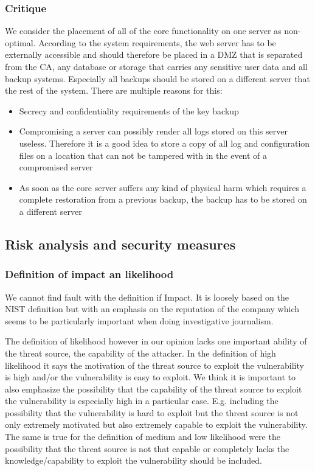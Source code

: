 \documentclass{article}
\begin{document}
\subsubsection{Critique}
We consider the placement of all of the core functionality on one server as non-optimal. According to the system requirements, the web server has to be externally accessible and should therefore be placed in a DMZ that is separated from the CA, any database or storage that carries any sensitive user data and all backup systems.\newline
Especially all backups should be stored on a different server that the rest of the system. There are multiple reasons for this:
	\begin{itemize}
	\item Secrecy and confidentiality requirements of the key backup
	\item Compromising a server can possibly render all logs stored on this server useless. Therefore it is a good idea to store a copy of all log and configuration files on a location that can not be tampered with in the event of a compromised server
	\item As soon as the core server suffers any kind of physical harm which requires a complete restoration from a previous backup, the backup has to be stored on a different server
	\end{itemize}

\subsection{Risk analysis and security measures}
\subsubsection{Definition of impact an likelihood}
We cannot find fault with the definition if Impact. It is loosely based on the NIST definition but with an emphasis on the reputation of the company which seems to be particularly important when doing investigative journalism.

The definition of likelihood however in our opinion lacks one important ability of the threat source, the capability of the attacker. In the definition of high likelihood it says the motivation of the threat source to exploit the vulnerability is high and/or the vulnerability is easy to exploit. We think it is important to also emphasize the possibility that the capability of the threat source to exploit the vulnerability is especially high in a particular case. E.g. including the possibility that the vulnerability is hard to exploit but the threat source is not only extremely motivated but also extremely capable to exploit the vulnerability.\newline
The same is true for the definition of medium and low likelihood were the possibility that the threat source is not that capable or completely lacks the knowledge/capability to exploit the vulnerability should be included.
\end{document}
